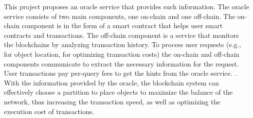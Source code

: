 This project proposes an oracle service that provides such information. The
oracle service consists of two main components, one on-chain and one off-chain.
The on-chain component is in the form of a smart contract that helps user smart
contracts and transactions. The off-chain component is a service that monitors
the blockchains by analyzing transaction history. To process user requests
(e.g., for object location, for optimizing transaction costs) the on-chain and
off-chain components communicate to extract the necessary information for the
request. User transactions pay per-query fees to get the hints from the oracle
service. . With the information provided by the oracle, the
blockchain system can effectively choose a partition to place objects to
maximize the balance of the network, thus increasing the transaction speed, as
well as optimizing the execution cost of transactions.



